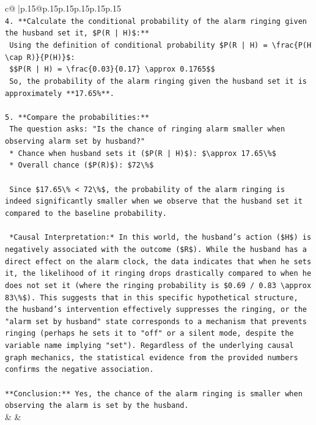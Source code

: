 \documentclass{article}
\begin{document}
{\begin{supertabular}{c@{$\;$}|p{.15\linewidth}@{}p{.15\linewidth}p{.15\linewidth}p{.15\linewidth}p{.15\linewidth}p{.15\linewidth}}
{{{\\ 
\texttt{4.  **Calculate the conditional probability of the alarm ringing given the husband set it, \$P(R | H)\$:**} \\
\texttt{    Using the definition of conditional probability \$P(R | H) = \textbackslash{}frac\{P(H \textbackslash{}cap R)\}\{P(H)\}\$:} \\
\texttt{    \$\$P(R | H) = \textbackslash{}frac\{0.03\}\{0.17\} \textbackslash{}approx 0.1765\$\$} \\
\texttt{    So, the probability of the alarm ringing given the husband set it is approximately **17.65\%**.} \\
\\ 
\texttt{5.  **Compare the probabilities:**} \\
\texttt{    The question asks: "Is the chance of ringing alarm smaller when observing alarm set by husband?"} \\
\texttt{    *   Chance when husband sets it (\$P(R | H)\$): \$\textbackslash{}approx 17.65\textbackslash{}\%\$} \\
\texttt{    *   Overall chance (\$P(R)\$): \$72\textbackslash{}\%\$} \\
\\ 
\texttt{    Since \$17.65\textbackslash{}\% < 72\textbackslash{}\%\$, the probability of the alarm ringing is indeed significantly smaller when we observe that the husband set it compared to the baseline probability.} \\
\\ 
\texttt{    *Causal Interpretation:* In this world, the husband's action (\$H\$) is negatively associated with the outcome (\$R\$). While the husband has a direct effect on the alarm clock, the data indicates that when he sets it, the likelihood of it ringing drops drastically compared to when he does not set it (where the ringing probability is \$0.69 / 0.83 \textbackslash{}approx 83\textbackslash{}\%\$). This suggests that in this specific hypothetical structure, the husband's intervention effectively suppresses the ringing, or the "alarm set by husband" state corresponds to a mechanism that prevents ringing (perhaps he sets it to "off" or a silent mode, despite the variable name implying "set"). Regardless of the underlying causal graph mechanics, the statistical evidence from the provided numbers confirms the negative association.} \\
\\ 
\texttt{**Conclusion:** Yes, the chance of the alarm ringing is smaller when observing the alarm is set by the husband.} \\
            }
        }
    }
    & & \\ \\


\end{supertabular}}
\end{document}
